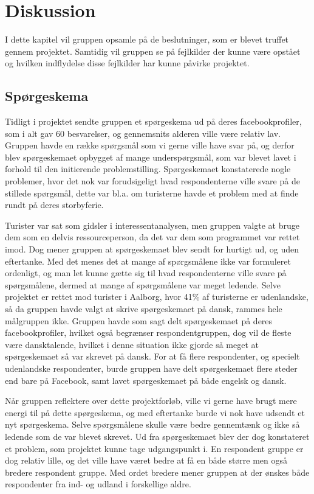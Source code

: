 \chapter{Diskussion}
I dette kapitel vil gruppen opsamle på de beslutninger, som er blevet truffet gennem projektet. Samtidig vil gruppen se på fejlkilder der kunne være opstået og hvilken indflydelse disse fejlkilder har kunne påvirke projektet. 

\section{Spørgeskema}
Tidligt i projektet sendte gruppen et spørgeskema ud på deres facebookprofiler, som i alt gav 60 besvarelser, og gennemsnits alderen ville være relativ lav. Gruppen havde en række spørgsmål som vi gerne ville have svar på, og derfor blev spørgeskemaet opbygget af mange underspørgsmål, som var blevet lavet i forhold til den initierende problemstilling. Spørgeskemaet konstaterede nogle problemer, hvor det nok var forudsigeligt hvad respondenterne ville svare på de stillede spørgsmål, dette var bl.a. om turisterne havde et problem med at finde rundt på deres storbyferie.

Turister var sat som gidsler i interessentanalysen, men gruppen valgte at bruge dem som en delvis ressourceperson, da det var dem som programmet var rettet imod. Dog mener gruppen at spørgeskemaet blev sendt for hurtigt ud, og uden eftertanke. Med det menes det at mange af spørgsmålene ikke var formuleret ordenligt, og man let kunne gætte sig til hvad respondenterne ville svare på spørgsmålene, dermed at mange af spørgsmålene var meget ledende. Selve projektet er rettet mod turister i Aalborg, hvor 41\% af turisterne er udenlandske, så da gruppen havde valgt at skrive spørgeskemaet på dansk, rammes hele målgruppen ikke. Gruppen havde som sagt delt spørgeskemaet på deres facebookprofiler, hvilket også begrænser respondentgruppen, dog vil de fleste være dansktalende, hvilket i denne situation ikke gjorde så meget at spørgeskemaet så var skrevet på dansk. For at få flere respondenter, og specielt udenlandske respondenter, burde gruppen have delt spørgeskemaet flere steder end bare på Facebook, samt lavet spørgeskemaet på både engelsk og dansk. 

Når gruppen reflektere over dette projektforløb, ville vi gerne have brugt mere energi til på dette spørgeskema, og med eftertanke burde vi nok have udsendt et nyt spørgeskema. Selve spørgsmålene skulle være bedre gennemtænk og ikke så ledende som de var blevet skrevet. Ud fra spørgeskemaet blev der dog konstateret et problem, som projektet kunne tage udgangspunkt i. En respondent gruppe er dog relativ lille, og det ville have været bedre at få en både større men også bredere respondent gruppe. Med ordet bredere mener gruppen at der ønskes både respondenter fra ind- og udland i forskellige aldre.

